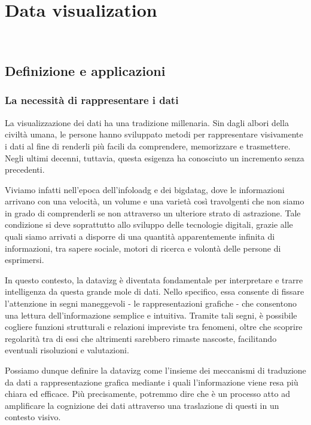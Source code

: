 \chapter{Data visualization}
\label{cap:studio_data_viz}
\\

\section{Definizione e applicazioni}
\subsection{La necessità di rappresentare i dati}
La visualizzazione dei dati ha una tradizione millenaria. Sin dagli albori della civiltà umana, 
le persone hanno sviluppato metodi per rappresentare visivamente i dati al fine di renderli più facili da comprendere, 
memorizzare e trasmettere.
Negli ultimi decenni, tuttavia, questa esigenza ha conosciuto un incremento senza precedenti.

Viviamo infatti nell'epoca dell'\gls{infoloadg} e dei \gls{bigdatag}, dove le informazioni
arrivano con una velocità, un volume e una varietà così travolgenti che non siamo in grado di comprenderli se non attraverso
un ulteriore strato di astrazione.
Tale condizione si deve soprattutto allo sviluppo delle tecnologie digitali, grazie alle quali siamo arrivati a disporre di una quantità 
apparentemente infinita di informazioni, tra sapere sociale, motori di ricerca e volontà delle persone di esprimersi.

In questo contesto, la \gls{datavizg} è diventata fondamentale per interpretare e trarre intelligenza da questa grande mole di dati.
Nello specifico, essa consente di fissare l'attenzione in segni maneggevoli - le rappresentazioni grafiche - che consentono una lettura dell'informazione
semplice e intuitiva. Tramite tali segni, è possibile cogliere funzioni strutturali e relazioni impreviste tra fenomeni, oltre che scoprire regolarità tra di essi che 
altrimenti sarebbero rimaste nascoste, facilitando eventuali risoluzioni e valutazioni.

\bigskip
\noindent Possiamo dunque definire la \gls{datavizg} come l'insieme dei meccanismi di traduzione da dati a rappresentazione grafica
mediante i quali l'informazione viene resa più chiara ed efficace. Più precisamente, 
potremmo dire che è un processo atto ad amplificare la cognizione dei dati attraverso
una traslazione di questi in un contesto visivo.



